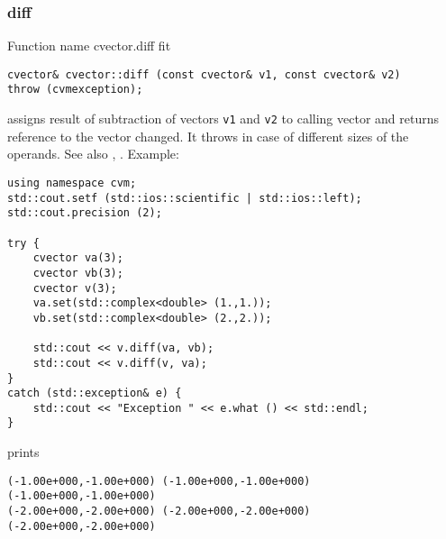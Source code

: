 \subsubsection{diff}
Function%
\pdfdest name {cvector.diff} fit
\begin{verbatim}
cvector& cvector::diff (const cvector& v1, const cvector& v2)
throw (cvmexception);
\end{verbatim}
assigns  result of subtraction of
vectors \verb"v1" and \verb"v2" to  calling vector
and returns  reference to
the vector changed.
It throws  
in case of different sizes of the operands.
See also ,
.
Example:
\begin{Verbatim}
using namespace cvm;
std::cout.setf (std::ios::scientific | std::ios::left);
std::cout.precision (2);

try {
    cvector va(3);
    cvector vb(3);
    cvector v(3);
    va.set(std::complex<double> (1.,1.));
    vb.set(std::complex<double> (2.,2.));

    std::cout << v.diff(va, vb);
    std::cout << v.diff(v, va);
}
catch (std::exception& e) {
    std::cout << "Exception " << e.what () << std::endl;
}
\end{Verbatim}
prints
\begin{Verbatim}
(-1.00e+000,-1.00e+000) (-1.00e+000,-1.00e+000) (-1.00e+000,-1.00e+000)
(-2.00e+000,-2.00e+000) (-2.00e+000,-2.00e+000) (-2.00e+000,-2.00e+000)
\end{Verbatim}
\newpage



